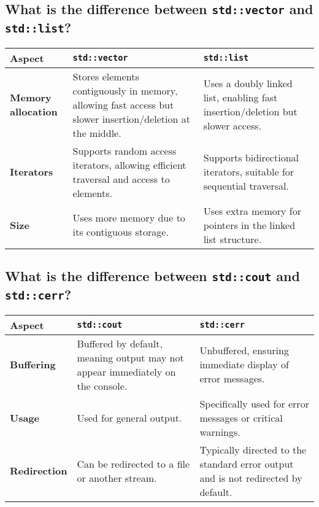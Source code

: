 \subsection{What is the difference between \texttt{std::vector} and \texttt{std::list}?}
\begin{tabularx}{\textwidth}{|p{3.5cm}|X|X|}
    \hline \rowcolor{tableheader}
    \textbf{Aspect}                   & \textbf{\texttt{std::vector}}                   & \textbf{\texttt{std::list}} \\
    \hline \textbf{Memory allocation} & Stores elements contiguously in memory, allowing fast access but slower insertion/deletion at the middle. & Uses a doubly linked list, enabling fast insertion/deletion but slower access. \\
    \hline \textbf{Iterators}         & Supports random access iterators, allowing efficient traversal and access to elements. & Supports bidirectional iterators, suitable for sequential traversal. \\
    \hline \textbf{Size}              & Uses more memory due to its contiguous storage. & Uses extra memory for pointers in the linked list structure. \\
    \hline
\end{tabularx}

\subsection{What is the difference between \texttt{std::cout} and \texttt{std::cerr}?}
\begin{tabularx}{\textwidth}{|p{3.5cm}|X|X|}
    \hline \rowcolor{tableheader}
    \textbf{Aspect}              & \textbf{\texttt{std::cout}}                    & \textbf{\texttt{std::cerr}} \\
    \hline \textbf{Buffering}    & Buffered by default, meaning output may not appear immediately on the console. & Unbuffered, ensuring immediate display of error messages. \\
    \hline \textbf{Usage}        & Used for general output.                       & Specifically used for error messages or critical warnings. \\
    \hline \textbf{Redirection}  & Can be redirected to a file or another stream. & Typically directed to the standard error output and is not redirected by default. \\
    \hline
\end{tabularx}

